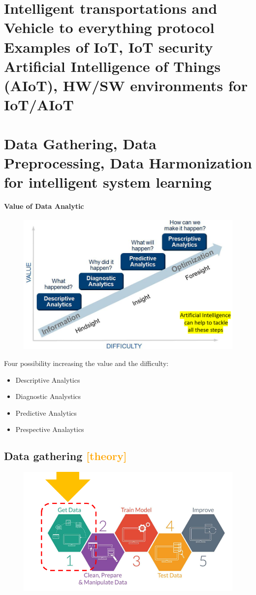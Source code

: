 
\chapter{Intelligent transportations and Vehicle to everything protocol Examples of IoT, IoT security Artificial Intelligence of Things (AIoT), HW/SW environments for IoT/AIoT}


\chapter{Data Gathering, Data Preprocessing, Data Harmonization for intelligent system learning}

\subsubsection{Value of Data Analytic}
\begin{figure}[H]
    \centering
    \includegraphics[width=0.8\linewidth]{07-08/images/Data.png}
\end{figure}

Four possibility increasing the value and the difficulty:
\begin{itemize}
    \item Descriptive Analytics
    \item Diagnostic Analystics
    \item Predictive Analytics
    \item Prespective Analaytics
\end{itemize}

\section{Data gathering \textcolor{orange}{[theory]}}
\begin{figure}[H]
    \centering
    \includegraphics[width=0.8\linewidth]{07-08/images/data ghatering.png}
\end{figure}

